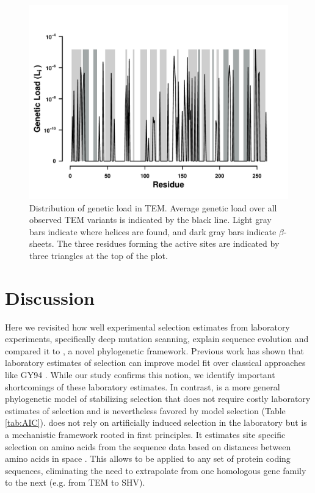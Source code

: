 \documentclass[12pt]{article}
\begin{document}
\begin{figure}[H]
     \centering
	\includegraphics[width=\textwidth]{img/GL_slide_TEM2016}
	\caption{Distribution of genetic load in TEM. 
	Average genetic load over all observed TEM variants is indicated by the black line. 
	Light gray bars indicate where helices are found, and dark gray bars indicate $\beta$-sheets.
	The three residues forming the active sites are indicated by three triangles at the top of the plot.}
	\label{fig:tem2016_sse}
\end{figure}

\section*{Discussion}

Here we revisited how well experimental selection estimates from laboratory experiments, specifically deep mutation scanning, explain sequence evolution and compared it to \selac, a novel phylogenetic framework.
Previous work has shown that laboratory estimates of selection can improve model fit over classical approaches like GY94 \citep{bloom2014, bloom2017}.
While our study confirms this notion, we identify important shortcomings of these laboratory estimates.
In contrast, \selac is a more general phylogenetic model of stabilizing selection that does not require costly laboratory estimates of selection and is nevertheless favored by model selection (Table \ref{tab:AIC}).
\selac does not rely on artificially induced selection in the laboratory but is a mechanistic framework rooted in first principles.
It estimates site specific selection on amino acids from the sequence data based on distances between amino acids in \PC space \citep{grantham1974,beaulieu2018}.
This allows \selac to be applied to any set of protein coding sequences, eliminating the need to extrapolate from one homologous gene family to the next (e.g. from TEM to SHV).
\end{document}
